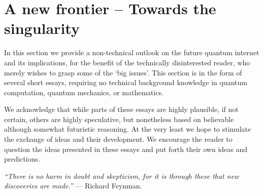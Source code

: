 %
%

\section{A new frontier -- Towards the singularity} \label{sec:outlook}  

In this section we provide a non-technical outlook on the future quantum internet and its implications, for the benefit of the technically disinterested reader, who merely wishes to grasp some of the `big issues'. This section is in the form of several short essays, requiring no technical background knowledge in quantum computation, quantum mechanics, or mathematics.

We acknowledge that while parts of these essays are highly plausible, if not certain, others are highly speculative, but nonetheless based on believable although somewhat futuristic reasoning. At the very least we hope to stimulate the exchange of ideas and their development. We encourage the reader to question the ideas presented in these essays and put forth their own ideas and predictions.

\textit{``There is no harm in doubt and skepticism, for it is through these that new discoveries are made.''} --- Richard Feynman.

%
%




%
%




%
%




%
%




%
%



